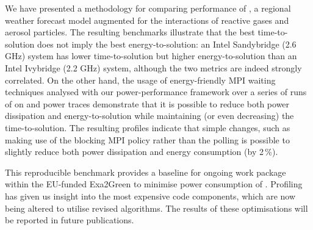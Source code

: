 We  have   presented  a  methodology  for   comparing  performance  of
\cosmoart,  a  regional  weather  forecast  model  augmented  for  the
interactions of  reactive gases and aerosol  particles.  The resulting
benchmarks illustrate  that the  best time-to-solution does  not imply
the best energy-to-solution: an Intel Sandybridge (2.6 GHz) system has
lower  time-to-solution but  higher energy-to-solution  than  an Intel
Ivybridge  (2.2  GHz) system,  although  the  two  metrics are  indeed
strongly correlated.  On the  other hand, the usage of energy-friendly
MPI waiting  techniques analysed with  our power-performance framework
over  a  series  of runs  of  \cosmoart  on  \tinto and  power  traces
demonstrate that it  is possible to reduce both  power dissipation and
energy-to-solution   while  maintaining   (or  even   decreasing)  the
time-to-solution. The resulting profiles indicate that simple changes,
such as making use of the  blocking MPI policy rather than the polling
is  possible to  slightly  reduce both  power  dissipation and  energy
consumption (by 2\,\%).

This  reproducible  benchmark provides  a  baseline  for ongoing  work
package within  the EU-funded Exa2Green to  minimise power consumption
of \cosmoart. Profiling  has given us insight into  the most expensive
code  components,  which are  now  being  altered  to utilise  revised
algorithms.  The  results of these  optimisations will be  reported in
future publications.
